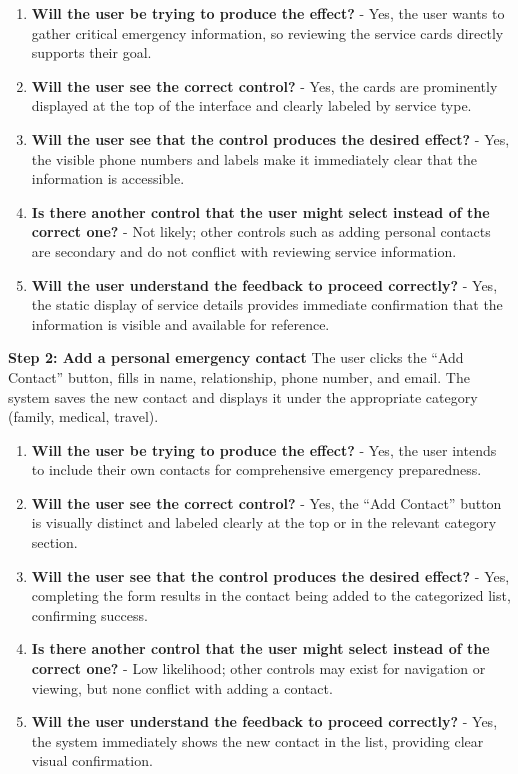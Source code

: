 \documentclass[11pt,a4paper]{article}
\begin{document}
\begin{enumerate}
    \item \textbf{Will the user be trying to produce the effect?} - Yes, the user wants to gather critical emergency information, so reviewing the service cards directly supports their goal.
    \item \textbf{Will the user see the correct control?} - Yes, the cards are prominently displayed at the top of the interface and clearly labeled by service type.
    \item \textbf{Will the user see that the control produces the desired effect?} - Yes, the visible phone numbers and labels make it immediately clear that the information is accessible.
    \item \textbf{Is there another control that the user might select instead of the correct one?} - Not likely; other controls such as adding personal contacts are secondary and do not conflict with reviewing service information.
    \item \textbf{Will the user understand the feedback to proceed correctly?} - Yes, the static display of service details provides immediate confirmation that the information is visible and available for reference.
\end{enumerate}

\textbf{Step 2: Add a personal emergency contact}  
The user clicks the “Add Contact” button, fills in name, relationship, phone number, and email. The system saves the new contact and displays it under the appropriate category (family, medical, travel).  

\begin{enumerate}
    \item \textbf{Will the user be trying to produce the effect?} - Yes, the user intends to include their own contacts for comprehensive emergency preparedness.
    \item \textbf{Will the user see the correct control?} - Yes, the “Add Contact” button is visually distinct and labeled clearly at the top or in the relevant category section.
    \item \textbf{Will the user see that the control produces the desired effect?} - Yes, completing the form results in the contact being added to the categorized list, confirming success.
    \item \textbf{Is there another control that the user might select instead of the correct one?} - Low likelihood; other controls may exist for navigation or viewing, but none conflict with adding a contact.
    \item \textbf{Will the user understand the feedback to proceed correctly?} - Yes, the system immediately shows the new contact in the list, providing clear visual confirmation.
\end{enumerate}
\end{document}
